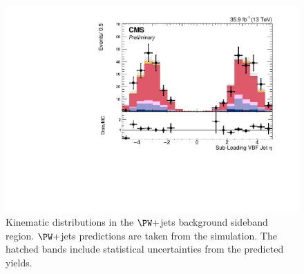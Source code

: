 \begin{figure}[htb]
\includegraphics[width=\cmsFigWidth]{Plots/plots/DibosonBoostedElMuCuts13TeV_WjetControlRegion_Tighter_CHS_vbf_maxpt_j2_eta.pdf}
\caption{Kinematic distributions in the $\PW+$jets background sideband region. $\PW+$jets predictions are taken from the simulation. The hatched bands include statistical uncertainties from the predicted yields.}
\label{fig:wjet_control}
\end{figure}
 
